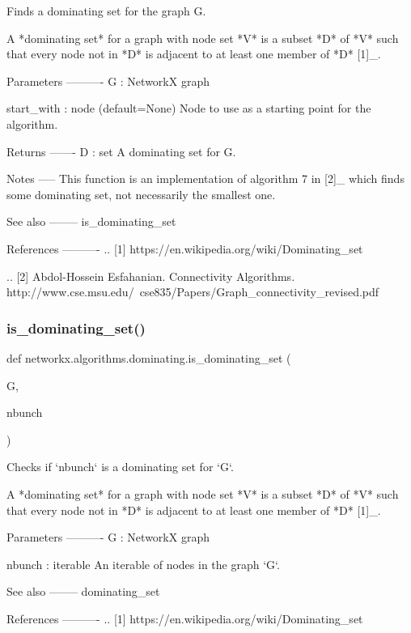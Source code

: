 \begin{DoxyVerb}Finds a dominating set for the graph G.

A *dominating set* for a graph with node set *V* is a subset *D* of
*V* such that every node not in *D* is adjacent to at least one
member of *D* [1]_.

Parameters
----------
G : NetworkX graph

start_with : node (default=None)
    Node to use as a starting point for the algorithm.

Returns
-------
D : set
    A dominating set for G.

Notes
-----
This function is an implementation of algorithm 7 in [2]_ which
finds some dominating set, not necessarily the smallest one.

See also
--------
is_dominating_set

References
----------
.. [1] https://en.wikipedia.org/wiki/Dominating_set

.. [2] Abdol-Hossein Esfahanian. Connectivity Algorithms.
    http://www.cse.msu.edu/~cse835/Papers/Graph_connectivity_revised.pdf\end{DoxyVerb}
 \mbox{\label{namespacenetworkx_1_1algorithms_1_1dominating_a69dcbfa764707fbc25fbb36133a8cf90}} 
\subsubsection{\texorpdfstring{is\+\_\+dominating\+\_\+set()}{is\_dominating\_set()}}
{\footnotesize\ttfamily def networkx.\+algorithms.\+dominating.\+is\+\_\+dominating\+\_\+set (\begin{DoxyParamCaption}\item[{}]{G,  }\item[{}]{nbunch }\end{DoxyParamCaption})}

\begin{DoxyVerb}Checks if `nbunch` is a dominating set for `G`.

A *dominating set* for a graph with node set *V* is a subset *D* of
*V* such that every node not in *D* is adjacent to at least one
member of *D* [1]_.

Parameters
----------
G : NetworkX graph

nbunch : iterable
    An iterable of nodes in the graph `G`.

See also
--------
dominating_set

References
----------
.. [1] https://en.wikipedia.org/wiki/Dominating_set\end{DoxyVerb}
 